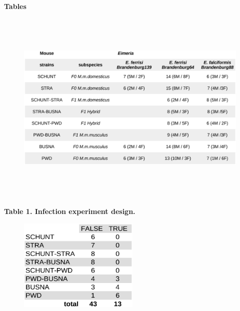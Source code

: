 \documentclass[12pt]{article}
\renewcommand{\_}{\kern-1.5pt\textunderscore\kern-1.5pt}
\begin{document}

\newpage
\par

\begin{FlushLeft}
{\fontsize{14pt}{16.8pt}\selectfont \textbf{Tables}\par}
\end{FlushLeft}\par




\begin{figure}[H]
	\begin{FlushLeft}		\includegraphics[width=6.92in,height=3.73in]{./media/image1.png}
	\end{FlushLeft}\end{figure}



\textbf{Table 1. Infection experiment design.}


\newpage
\par




\begin{figure}[H]
	\begin{Center}
		\includegraphics[width=2.26in,height=1.74in]{./media/image2.png}
	\end{Center}
\end{figure}
\end{document}
